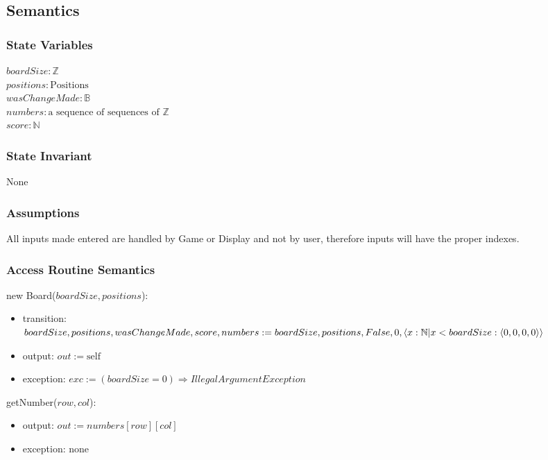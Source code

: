 \documentclass[12pt]{article}
\begin{document}
\subsection* {Semantics}

\subsubsection* {State Variables}

$boardSize: \mathbb{Z}$\\
$positions: \text{Positions}$ \\
$wasChangeMade: \mathbb{B}$ \\
$numbers: \text{a sequence of sequences of }\mathbb{Z}$ \\
$score: \mathbb{N}$

\subsubsection* {State Invariant}

None

\subsubsection* {Assumptions}

All inputs made entered are handled by Game or Display and not by user, therefore inputs will have the proper indexes.

\subsubsection* {Access Routine Semantics}

\noindent new Board($\mathit{boardSize, positions}$):
\begin{itemize}
\item transition: \\
$boardSize, positions, wasChangeMade, score, numbers := \\
boardSize, positions, False, 0, \langle x : \mathbb{N}|x < boardSize : \langle 0, 0, 0, 0 \rangle \rangle$
\item output: $out := \mbox{self}$
\item exception: $exc := (boardSize = 0) \Rightarrow IllegalArgumentException $
\end{itemize}    


\noindent getNumber($row, col$):
\begin{itemize}
\item output: $out := numbers[row][col]$
\item exception: none
\end{itemize}   
\end{document}
